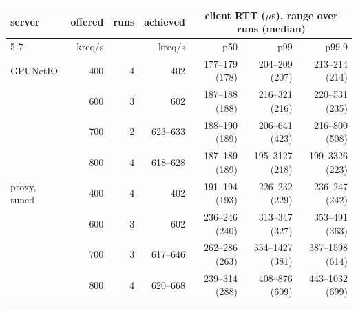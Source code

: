 \begin{tabular}{lrrrrrr}\toprule
server & offered & runs & achieved & \multicolumn{3}{c}{client RTT ($\mu$s), range over runs (median)} \\
\cmidrule(lr){5-7}
 & kreq/s & & kreq/s & p50 & p99 & p99.9 \\ \midrule
GPUNetIO & 400 & 4 & 402 & 177--179 (178) & 204--209 (207) & 213--214 (214) \\
 & 600 & 3 & 602 & 187--188 (188) & 216--321 (216) & 220--531 (235) \\
 & 700 & 2 & 623--633 & 188--190 (189) & 206--641 (423) & 216--800 (508) \\
 & 800 & 4 & 618--628 & 187--189 (189) & 195--3127 (218) & 199--3326 (223) \\
\addlinespace
proxy, tuned & 400 & 4 & 402 & 191--194 (193) & 226--232 (229) & 236--247 (242) \\
 & 600 & 3 & 602 & 236--246 (240) & 313--347 (327) & 353--491 (363) \\
 & 700 & 3 & 617--646 & 262--286 (263) & 354--1427 (381) & 387--1598 (614) \\
 & 800 & 4 & 620--668 & 239--314 (288) & 408--876 (609) & 443--1032 (699) \\
\addlinespace
\bottomrule\end{tabular}
